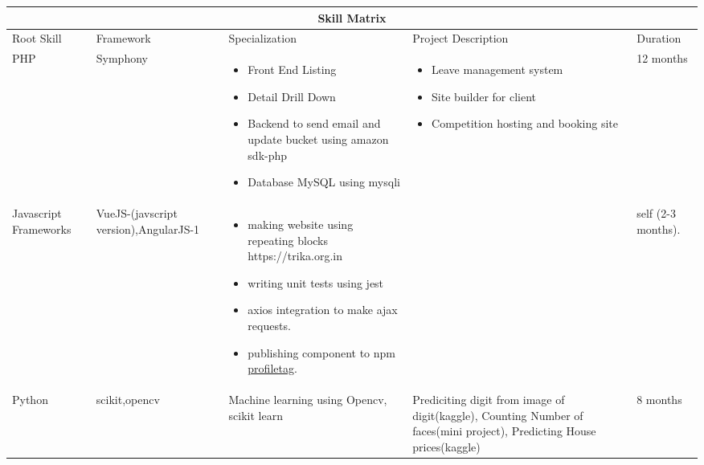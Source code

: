 \begin{center}
\begin{tabular}{|p{1.5cm}|p{2cm}|p{7cm}|p{7cm}|p{2cm}| }
 \hline
 \multicolumn{5}{|c|}{Skill Matrix} \\
 \hline
Root Skill &Framework &Specialization &Project Description &Duration\\
\hline
PHP
    & Symphony
& \begin{itemize} 
    \item Front End Listing 
    \item Detail Drill Down 
    \item Backend to send email and update bucket using amazon sdk-php 
    \item Database MySQL using mysqli 
\end{itemize}
    &\begin{itemize} 
	    \item Leave management system 
	    \item Site builder for client 
	    \item Competition hosting and booking site
	\end{itemize}
    & 12  months \\

\hline
    Javascript Frameworks
    & VueJS-(javscript version),AngularJS-1
    & \begin{itemize} 
    \item making website using repeating blocks https://trika.org.in
    \item writing unit tests using jest
    \item axios integration to make ajax requests.
    \item publishing component to npm
	\href{https://www.npmjs.com/package/@kurian2020/profiletag}{profiletag}.
    \end{itemize} 
    & 
    & self (2-3 months). \\
    \hline
Python 
& scikit,opencv 
& Machine learning using Opencv, scikit learn 
    & Prediciting digit from image of digit(kaggle), Counting Number of
    faces(mini project), Predicting House prices(kaggle) 
& 8 months \\
\hline
\end{tabular}
\end{center}

